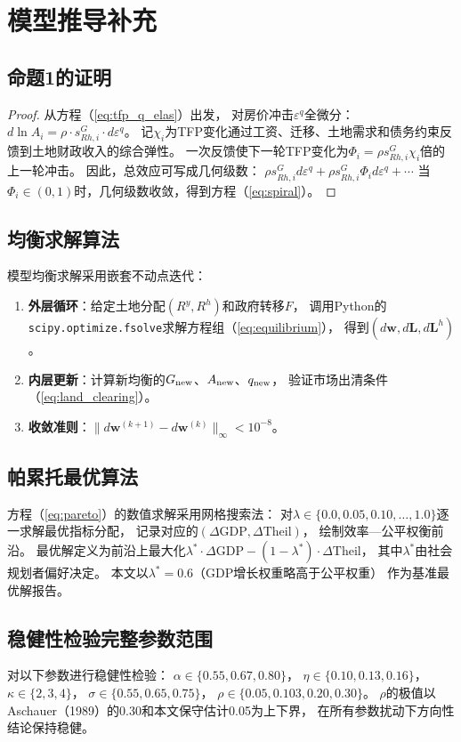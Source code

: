 \documentclass[UTF8,a4paper,12pt]{ctexart}
\theoremstyle{plain}
\theoremstyle{definition}
\theoremstyle{remark}
\newcommand{\Ry}{R^{y}}
\newcommand{\Rh}{R^{h}}
\begin{document}
\appendix
\section{模型推导补充}

\subsection{命题1的证明}

\begin{proof}
从方程（\ref{eq:tfp_q_elas}）出发，
对房价冲击$\varepsilon^q$全微分：
$d\ln A_i = \rho\cdot s^G_{Rh,i}\cdot d\varepsilon^q$。
记$\chi_i$为TFP变化通过工资、迁移、土地需求和债务约束反馈到土地财政收入的综合弹性。
一次反馈使下一轮TFP变化为$\Phi_i=\rho s^G_{Rh,i}\chi_i$倍的上一轮冲击。
因此，总效应可写成几何级数：
$\rho s^G_{Rh,i}d\varepsilon^q + \rho s^G_{Rh,i}\Phi_i d\varepsilon^q + \cdots$
当$\Phi_i\in(0,1)$时，几何级数收敛，得到方程（\ref{eq:spiral}）。
\end{proof}

\subsection{均衡求解算法}

模型均衡求解采用嵌套不动点迭代：
\begin{enumerate}[leftmargin=2em]
\item \textbf{外层循环}：给定土地分配$(\Ry,\Rh)$和政府转移$F$，
  调用Python的\texttt{scipy.optimize.fsolve}求解方程组（\ref{eq:equilibrium}），
  得到$(d\bm{w},d\bm{L},d\bm{L}^h)$。
\item \textbf{内层更新}：计算新均衡的$G_{\rm new}$、$A_{\rm new}$、$q_{\rm new}$，
  验证市场出清条件（\ref{eq:land_clearing}）。
\item \textbf{收敛准则}：$\|d\bm{w}^{(k+1)}-d\bm{w}^{(k)}\|_\infty < 10^{-8}$。
\end{enumerate}

\subsection{帕累托最优算法}

方程（\ref{eq:pareto}）的数值求解采用网格搜索法：
对$\lambda\in\{0.0,0.05,0.10,\ldots,1.0\}$逐一求解最优指标分配，
记录对应的$(\Delta\text{GDP},\Delta\text{Theil})$，
绘制效率—公平权衡前沿。
最优解定义为前沿上最大化$\lambda^*\cdot\Delta\text{GDP}-(1-\lambda^*)\cdot\Delta\text{Theil}$，
其中$\lambda^*$由社会规划者偏好决定。
本文以$\lambda^*=0.6$（GDP增长权重略高于公平权重）
作为基准最优解报告。

\subsection{稳健性检验完整参数范围}

对以下参数进行稳健性检验：
$\alpha\in\{0.55,0.67,0.80\}$，
$\eta\in\{0.10,0.13,0.16\}$，
$\kappa\in\{2,3,4\}$，
$\sigma\in\{0.55,0.65,0.75\}$，
$\rho\in\{0.05,0.103,0.20,0.30\}$。
$\rho$的极值以Aschauer（1989）的0.30和本文保守估计0.05为上下界，
在所有参数扰动下方向性结论保持稳健。
\end{document}
